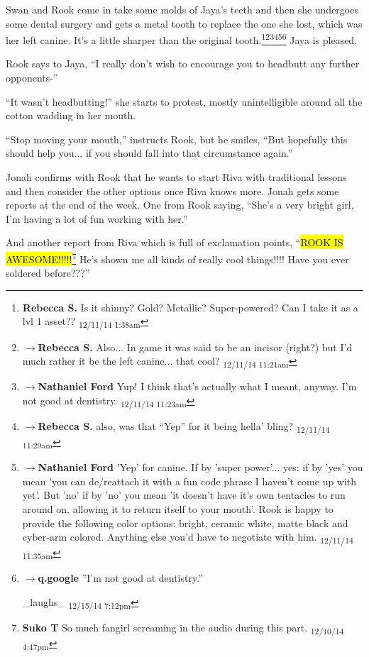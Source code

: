 Swan and Rook come in take some molds of Jaya's teeth and then she undergoes some dental surgery and gets a metal tooth to replace the one she lost, which was her left canine.  It's a little sharper than the original tooth.\footnote{\textbf{Rebecca S. }Is it shinny? Gold? Metallic? Super-powered? Can I take it as a lvl 1 asset?? \textsubscript{12/11/14 1:38am}}\footnote{$\rightarrow$\textbf{Rebecca S. }Also... In game it was said to be an incisor (right?) but I'd much rather it be the left canine... that cool? \textsubscript{12/11/14 11:21am}}\footnote{$\rightarrow$\textbf{Nathaniel Ford }Yup! I think that's actually what I meant, anyway. I'm not good at dentistry. \textsubscript{12/11/14 11:23am}}\footnote{$\rightarrow$\textbf{Rebecca S. }also, was that ``Yep'' for it being hella' bling? \textsubscript{12/11/14 11:29am}}\footnote{$\rightarrow$\textbf{Nathaniel Ford }'Yep' for canine. If by 'super power'... yes: if by 'yes' you mean 'you can de/reattach it with a fun code phrase I haven't come up with yet'. But 'no' if by 'no' you mean 'it doesn't have it's own tentacles to run around on, allowing it to return itself to your mouth'. Rook is happy to provide the following color options: bright, ceramic white, matte black and cyber-arm colored. Anything else you'd have to negotiate with him. \textsubscript{12/11/14 11:35am}}\footnote{$\rightarrow$\textbf{q.google }''I'm not good at dentistry.''

\_laughs\_ \textsubscript{12/15/14 7:12pm}}  Jaya is pleased.

Rook says to Jaya, ``I really don't wish to encourage you to headbutt any further opponents-''

``It wasn't headbutting!'' she starts to protest, mostly unintelligible around all the cotton wadding in her mouth.

``Stop moving your mouth,'' instructs Rook, but he smiles, ``But hopefully this should help you... if you should fall into that circumstance again.''





Jonah confirms with Rook that he wants to start Riva with traditional lessons and then consider the other options once Riva knows more.  Jonah gets some reports at the end of the week.  One from Rook saying, ``She's a very bright girl, I'm having a lot of fun working with her.''

And another report from Riva which is full of exclamation points, ``\hl{ROOK IS AWESOME!!!!!}\footnote{\textbf{Suko T }So much fangirl screaming in the audio during this part. \textsubscript{12/10/14 4:47pm}}  He's shown me all kinds of really cool things!!!! Have you ever soldered before???''

